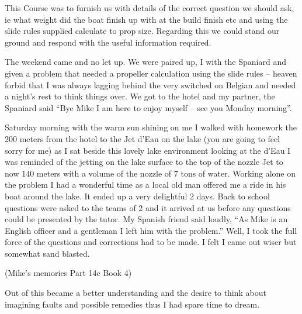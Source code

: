 This Course was to furnish us with details of the correct question we should
ask, ie what weight did the boat finish up with at the build finish etc and
using the slide rules supplied calculate to prop size.   Regarding this we
could stand our ground and respond with the useful information required.

The weekend came and no let up.  We were  paired up, I with the Spaniard and
given a problem that needed a propeller calculation using the slide rules –
heaven forbid that I was always lagging behind  the very switched on Belgian
and needed a night's rest to think things over.  We got to the hotel and my
partner, the Spaniard said ``Bye Mike I am here to enjoy myself – see you
Monday morning''.

Saturday morning with the warm sun shining on me I walked with homework the 200
meters from the hotel to the Jet d'Eau on the lake (you are going to feel sorry
for me) as I sat beside this lovely lake environment looking at the d'Eau I was
reminded of the jetting on the lake surface to the top of the nozzle Jet to now
140 meters with a volume of the nozzle of 7 tons of water.  Working alone on
the problem I had a wonderful time as a local old man offered me a ride in his
boat around the lake.  It ended up a very delightful 2 days.  Back to school
questions were asked to the teams of 2 and it arrived at us before any
questions could be presented by the tutor.  My Spanish friend said loudly, ``As
Mike is an English officer and a gentleman I left him with the problem.'' Well,
I took the full force of the questions and corrections had to be made.  I felt
I came out wiser but somewhat sand blasted.

(Mike's memories Part 14c Book 4)

Out of this became a better understanding and the desire to think about
imagining faults and possible remedies thus I had spare time to dream.
















































